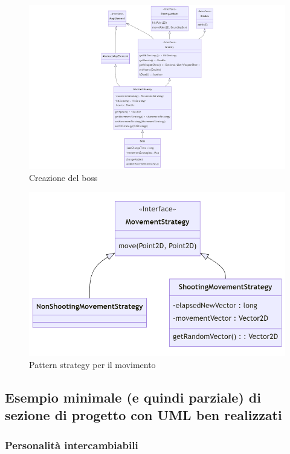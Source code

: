 \documentclass[a4paper,12pt]{report}
\begin{document}
\begin{figure}
\centering{}
\includegraphics[scale=0.5]{diagram/boss.png}
\caption{Creazione del boss}
\label{Boss}
\end{figure}

\begin{figure}
\centering{}
\includegraphics[scale=0.5]{diagram/movementStrategy.png}
\caption{Pattern strategy per il movimento}
\label{Boss}
\end{figure}

\subsection*{Esempio minimale (e quindi parziale) di sezione di progetto con UML ben realizzati}

\subsubsection{Personalità intercambiabili}
\end{document}
